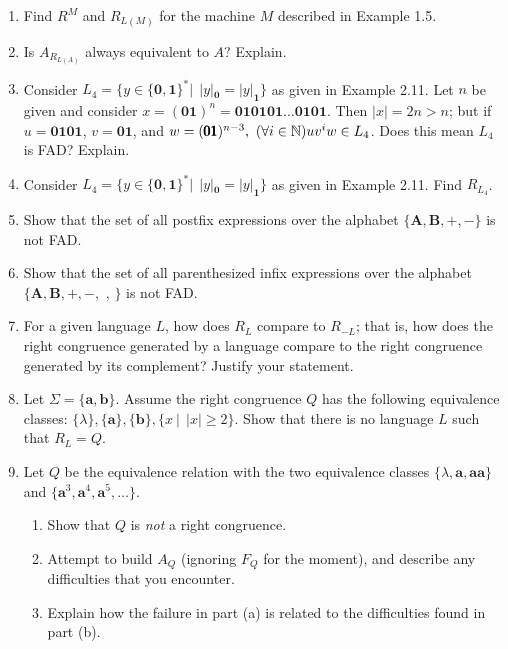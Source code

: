 \begin{enumerate}[{2.}1.]
\item Find $R^M$ and $R_{L(M)}$ for the machine $M$ described in Example 1.5.

\item Is $A_{R_{L(A)}}$ always equivalent to $A$? Explain.

\item Consider $L_4=\{y \in \{\pmb{0},\pmb{1}\}^* |\ \ |y|_{\pmb{0}} =
|y|_{\pmb{1}}\}$ as given in Example 2.11. Let $n$ be given and consider
$x$$=$$(\pmb{01})^n = \pmb{010101} \ldots \pmb{0101}$. Then $|x| = 2n > n$; but if
$u = \pmb{0101}$, $v = \pmb{01}$, and $w = (\pmb{01})^{n-3},\ (\forall i \in
\mathbb{N})uv^iw \in L_4$. Does this mean $L_4$ is FAD? Explain.

\item Consider $L_4=\{y \in \{\pmb{0},\pmb{1}\}^* |\ \ |y|_{\pmb{0}} =
|y|_{\pmb{1}}\}$ as given in Example 2.11. Find $R_{L_4}$.

\item Show that the set of all postfix expressions over the alphabet
$\{\pmb{A},\pmb{B},\pmb{+},\pmb{-}\}$ is not FAD.

\item Show that the set of all parenthesized infix expressions over the alphabet
$\{\pmb{A},\pmb{B},\pmb{+},\pmb{-},$ \pmb{(}, \pmb{)}$\}$ is not FAD.

\item For a given language $L$, how does $R_L$ compare to $R_{-L}$; that is, how
does the right congruence generated by a language compare to the right
congruence generated by its complement? Justify your statement.

\item Let $\Sigma=\{\pmb{a},\pmb{b}\}$. Assume the right congruence $Q$ has the
following equivalence classes: $\{\lambda\},\{\pmb{a}\},\{\pmb{b}\},\{x\ |\ \ |x|
\geq 2\}$. Show that there is no language $L$ such that $R_L = Q$.

\item Let $Q$ be the equivalence relation with the two equivalence classes
$\{\lambda,\pmb{a},\pmb{aa}\}$ and $\{\pmb{a}^3,\pmb{a}^4,\pmb{a}^5,\ldots\}$.
\begin{enumerate}
\item Show that $Q$ is \emph{not} a right congruence.
\item Attempt to build $A_Q$ (ignoring $F_Q$ for the moment), and describe any
difficulties that you encounter.
\item Explain how the failure in part (a) is related to the difficulties found
in part (b).
\end{enumerate}


\end{enumerate}
